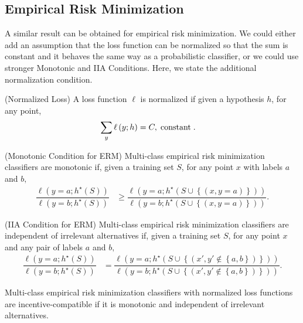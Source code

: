 \documentclass{article}
\begin{document}
\subsection{Empirical Risk Minimization}
A similar result can be obtained for empirical risk minimization. We could either add an assumption that the loss function can be normalized so that the sum is constant and it behaves the same way as a probabilistic classifier, or we could use stronger Monotonic and IIA Conditions. Here, we state the additional normalization condition.
\newline \newline
\begin{df} \label{df:nrml} 
(Normalized Loss) A loss function $\ell$ is normalized if given a hypothesis $h $, for any point,
\begin{align*}
\displaystyle\sum_{y} \ell\left(y ; h\right) &= C , \text{\;constant\;} .
\end{align*}\end{df}
\begin{df} \label{df:monoerm} 
(Monotonic Condition for ERM) Multi-class empirical risk minimization classifiers are monotonic if, given a training set $S $, for any point $x $ with labels $a $ and $b, $
\begin{align*}
\dfrac{\ell\left(y = a ; h^\star \left(S\right)\right)}{\ell\left(y = b ; h^\star \left(S\right)\right)} &\geq  \dfrac{\ell\left(y = a ; h^\star \left(S \cup \left\{\left(x, y = a\right)\right\}\right)\right)}{\ell\left(y = b ; h^\star \left(S \cup \left\{\left(x, y = a\right)\right\}\right)\right)}.
\end{align*}\end{df}
\begin{df} \label{df:iiaerm} 
(IIA Condition for ERM) Multi-class empirical risk minimization classifiers are independent of irrelevant alternatives if, given a training set $S $, for any point $x $ and any pair of labels $a $ and $b, $
\begin{align*}
\dfrac{\ell\left(y = a ; h^\star \left(S\right)\right)}{\ell\left(y = b ; h^\star \left(S\right)\right)} &= \dfrac{\ell\left(y = a ; h^\star \left(S \cup \left\{\left(x', y' \notin \left\{a, b\right\}\right)\right\}\right)\right)}{\ell\left(y = b ; h^\star \left(S \cup \left\{\left(x', y' \notin \left\{a, b\right\}\right)\right\}\right)\right)}.
\end{align*}\end{df}
\begin{cor} \label{cor:marginerm} 
Multi-class empirical risk minimization classifiers with normalized loss functions are incentive-compatible if it is monotonic and independent of irrelevant alternatives.
\end{cor}
\end{document}
